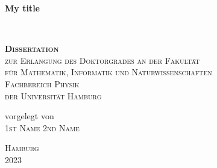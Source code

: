
\begin{titlepage} %
\frontmatter


\vspace{2cm}
    \centering

	\vspace{0.4cm}
    \parbox[t]{0.96\textwidth}{\rmfamily \setlength\parfillskip{0pt} \def\baselinestretch{1.1}\centering\Huge \bfseries My title}\\
	\vspace{0.4cm}
    \vspace{2 cm} %
	
	
    \parbox[p]{0.95\textwidth}{\def\baselinestretch{1.4}\centering\scshape\textbf{\LARGE Dissertation} \\ {\large zur Erlangung des Doktorgrades an der Fakult{\"a}t\\ f{\"u}r Mathematik, Informatik und Naturwissenschaften \\ Fachbereich Physik \\ der Universit{\"a}t Hamburg} }
    
    \vspace{2 cm} %

    \parbox[b]{0.93\textwidth}{\def\baselinestretch{1.3}\centering\upshape \large vorgelegt von \\ {\LARGE\scshape  1st Name 2nd Name} \\ %
    }
    
    \vspace{2 cm} %
    
    \parbox[b]{0.93\textwidth}{\def\baselinestretch{1.3}\centering \large\scshape Hamburg\\\scshape 2023}

\end{titlepage}

